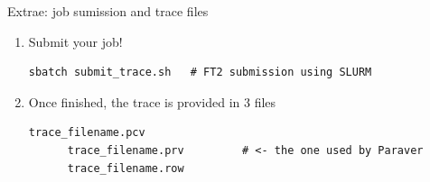 \documentclass[10pt,xcolor=table]{beamer}
\begin{document}


\begin{frame}[fragile]{Extrae: job sumission and trace files}
  \begin{enumerate}
  \item Submit your job!
    \begin{lstlisting}[style=shell,gobble=5]
      sbatch submit_trace.sh   # FT2 submission using SLURM
    \end{lstlisting}
  \item Once finished, the trace is provided in 3 files
    \begin{lstlisting}[style=shell,gobble=5]
      trace_filename.pcv
      trace_filename.prv         # <- the one used by Paraver
      trace_filename.row
    \end{lstlisting}
  \end{enumerate}
\end{frame}
\end{document}
